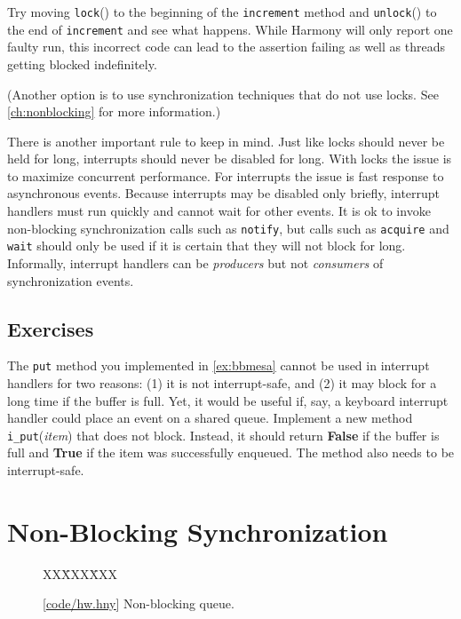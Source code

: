 \documentclass{report}
\newcommand{\harmonysource}[1]{
\begin{tabbing}
XX\=XXX\=XXX\kill
    
\end{tabbing}
}
\newcommand{\harmonylink}[1]{%
[\href{https://harmony.cs.cornell.edu/#1}{\underline{#1}}]%
}
\newenvironment{code}{
\tcolorbox
}{
\endtcolorbox
}
\begin{document}
Try moving \texttt{lock}() to the beginning of the \texttt{increment} method
and \texttt{unlock}() to the end of \texttt{increment} and see what happens.
While Harmony will only report one faulty run, this incorrect code can lead to
the assertion failing as well as threads getting blocked indefinitely.

(Another option is to use synchronization techniques that do not use locks.
See \autoref{ch:nonblocking} for more information.)

There is another important rule to keep in mind.  Just like locks should never be held
for long, interrupts should never be disabled for long.  With locks the issue is to
maximize concurrent performance.  For interrupts the issue is fast response to
asynchronous events.  Because interrupts may be disabled only briefly, interrupt
handlers must run quickly and cannot wait for other events.  It is ok to invoke
non-blocking synchronization calls such as \texttt{notify}, but calls such as
\texttt{acquire} and \texttt{wait} should only be used if it is certain that they will not
block for long.  Informally, interrupt handlers can be
\emph{producers} but not \emph{consumers} of synchronization events.

\section*{Exercises}
\begin{problems}
\item The \texttt{put} method you implemented in \autoref{ex:bbmesa} cannot be used
in interrupt handlers for two reasons: (1) it is not interrupt-safe, and (2)
it may block for a long time if the buffer is full.  Yet, it would be useful if,
say, a keyboard interrupt handler could place an event on a shared queue.
Implement a new method \texttt{i\_put}(\textit{item}) that does not
block.  Instead, it should return \textbf{False} if the buffer is full and \textbf{True}
if the item was successfully enqueued.
The method also needs to be interrupt-safe.
\end{problems}

\chapter{Non-Blocking Synchronization}
\label{ch:nonblocking}
%

%

\begin{figure}
\begin{code}
\harmonysource{hw}
\end{code}
\caption{\harmonylink{code/hw.hny} Non-blocking queue.}
\label{fig:hw}
\end{figure}
\end{document}
